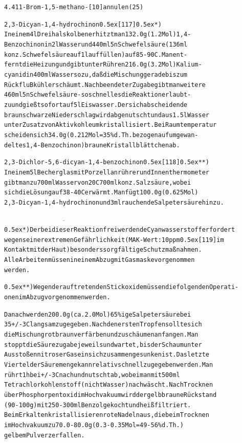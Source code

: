 \documentclass[a4paper,11pt]{article}
\begin{document}
\begin{alltt}
4.4  11-Brom-1,5-methano-[10]annulen (25)

2,3-Dicyan-1‚4-hydrochinon \raise0.5ex\hbox{[117]} \leavevmode\raise0.5ex\hbox{*})
In einem 4 l Dreihalskolben erhitzt man 132.0 g (1.2 Mol) 1,4-
Benzochinon in 2 l Wasser und 440 ml 5 n Schwefelsäure (136 ml
konz. Schwefelsäure auf 1 l auffüllen) auf 85 - 90\degree{}C. Man ent-
fernt die Heizung und gibt unter Rühren 216.0 g (3.2 Mol) Kalium-
cyanid in 400 ml Wasser so zu, daß die Mischung gerade bis zum
RückfluBkühler schäumt. Nach beendeter Zugabe gibt man weitere
460 ml 5 n Schwefelsäure - so schnell es die Reaktion erlaubt -
zu und gießt sofort auf 5 l Eiswasser. Der sich abscheidende
braunschwarze Niederschlag wird abgenutscht und aus 1.5 l Wasser
unter Zusatz von Aktivkohle umkristallisiert. Bei Raumtemperatur
scheiden sich 34.0 g (0.212 Mol = 35 \% d.Th. bezogen auf umgewan-
deltes 1,4-Benzochinon) braune Kristallblättchen ab.

2,3-Dichlor-5,6-dicyan-1,4-benzochinon \raise0.5ex\hbox{[118]} \leavevmode\raise0.5ex\hbox{**})
In einem 5 l Becherglas mit Porzellanrührer und Innenthermometer
gibt man zu 700 ml Wasser von 20\degree{}C 700 ml konz. Salzsäure, wobei
sich die Lösung auf 38 - 40\degree{}C erwärmt. Man fügt 100.0 g (0.625 Mol)
2,3-Dicyan-1,4-hydrochinon und 3 ml rauchende Salpetersäure hinzu.

\(\overline{\hspace{7cm}}\)
 \leavevmode\raise0.5ex\hbox{*}) Der bei dieser Reaktion frei werdende Cyanwasserstoff erfordert
    wegen seiner extremen Gefährlichkeit (MAK-Wert: 10 ppm \raise0.5ex\hbox{[119]} im
    Kontakt mit der Haut) besonders sorgfältige Schutzmaßnahmen.
    Alle Arbeiten müssen in einem Abzug mit Gasmaske vorgenommen
    werden.

\leavevmode\raise0.5ex\hbox{**}) Wegen der auftretenden Stickoxide müssen die folgenden Operati-
    onen im Abzug vorgenommen werden.

\newpage
{}


Danach werden 200.0 g (ca. 2.0 Mol) 65 \%ige Salpetersäure bei
35 +/- 3\degree{}C langsam zugegeben. Nach den ersten Tropfen sollte sich
die Mischung rotbraun verfärben und zu schäumen anfangen. Man
stoppt die Säurezugabe jeweils und wartet, bis der Schaum unter
Ausstoßen nitroser Gase in sich zusammengesunken ist. Das letzte
Viertel der Säuremenge kann relativ schnell zugegeben werden. Man
rührt 1 h bei +/- 3\degree{}C nach und nutscht ab, wobei man mit 500 ml
Tetrachlorkohlenstoff (nicht Wasser) nachwäscht. Nach Trocknen
über Phosphorpentoxid im Hochvakuum wird der gelbbraune Rückstand
(90 - 100 g) mit 250 - 300 ml Benzol gekocht und heiß filtriert.
Beim Erkalten kristallisieren rote Nadeln aus, die beim Trocknen
im Hochvakuum zu 70.0 - 80.0 g (0.3 - 0.35 Mol = 49 - 56 \% d.Th.)
gelbem Pulver zerfallen.



\end{alltt}
\end{document}
